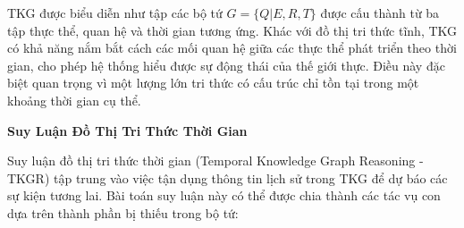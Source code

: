 TKG được biểu diễn như tập các bộ tứ $G = \{Q|E, R, T\}$ được cấu thành từ ba tập thực thể, quan hệ và thời gian tương ứng. Khác với đồ thị tri thức tĩnh, TKG có khả năng nắm bắt cách các mối quan hệ giữa các thực thể phát triển theo thời gian, cho phép hệ thống hiểu được sự động thái của thế giới thực. Điều này đặc biệt quan trọng vì một lượng lớn tri thức có cấu trúc chỉ tồn tại trong một khoảng thời gian cụ thể.

\vspace{1em}
\textbf{Suy Luận Đồ Thị Tri Thức Thời Gian}

Suy luận đồ thị tri thức thời gian (Temporal Knowledge Graph Reasoning - TKGR) tập trung vào việc tận dụng thông tin lịch sử trong TKG để dự báo các sự kiện tương lai. Bài toán suy luận này có thể được chia thành các tác vụ con dựa trên thành phần bị thiếu trong bộ tứ:

